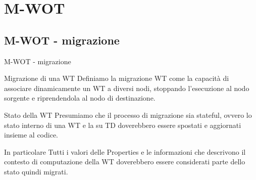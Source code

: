 \documentclass{beamer}
\begin{document}
\section{M-WOT}


\subsection{M-WOT - migrazione}
\begin{frame}{M-WOT - migrazione}
\begin{block}{Migrazione di una WT}
Definiamo la migrazione WT come la capacità di associare dinamicamente un WT a diversi nodi, stoppando l'esecuzione al nodo sorgente e riprendendola al nodo di destinazione. \\
\end{block}
\begin{block}{Stato della WT}
	Presumiamo che il processo di migrazione sia stateful, ovvero lo stato interno di una WT e la su TD doverebbero essere spostati e aggiornati insieme al codice. \\
\end{block}
\begin{block}{In particolare}
	Tutti i valori delle Properties e le informazioni che descrivono il contesto di  computazione della WT doverebbero essere considerati parte dello stato quindi migrati.
\end{block}

\end{frame}
\end{document}
